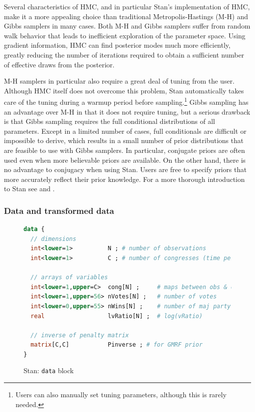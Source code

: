 Several characteristics of HMC, and in particular Stan's implementation of HMC, make it a more appealing choice than traditional Metropolis-Hastings (M-H) and Gibbs samplers in many cases. Both M-H and Gibbs samplers suffer from random walk behavior that leads to inefficient exploration of the parameter space. Using gradient information, HMC can find posterior modes much more efficiently, greatly reducing the number of iterations required to obtain a sufficient number of effective draws from the posterior. 

M-H samplers in particular also require a great deal of tuning from the user. Although HMC itself does not overcome this problem, Stan automatically takes care of the tuning during a warmup period before sampling.\footnote{Users can also manually set tuning parameters, although this is rarely needed.} Gibbs sampling has an advantage over M-H in that it does not require tuning, but a serious drawback is that Gibbs sampling requires the full conditional distributions of all parameters. Except in a limited number of cases, full conditionals are difficult or impossible to derive, which results in a small number of prior distributions that are feasible to use with Gibbs samplers. In particular, conjugate priors are often used even when more believable priors are available. On the other hand, there is no advantage to conjugacy when using Stan. Users are free to specify priors that more accurately reflect their prior knowledge. For a more thorough introduction to Stan see  and .

\subsubsection{Data and transformed data}

\begin{figure}[h]
\begin{lstlisting}[language=Stan, frame=trBL]
data {
  // dimensions 
  int<lower=1>          N ; # number of observations 
  int<lower=1>          C ; # number of congresses (time periods)
  
  // arrays of variables 
  int<lower=1,upper=C>  cong[N] ;     # maps between obs & congress
  int<lower=1,upper=56> nVotes[N] ;   # number of votes
  int<lower=0,upper=55> nWins[N] ;    # number of maj party victories
  real                  lvRatio[N] ;  # log(vRatio)
  
  // inverse of penalty matrix 
  matrix[C,C]           Pinverse ; # for GMRF prior
}
\end{lstlisting}
\caption{Stan: {\tt data} block}
\label{stan_data}
\end{figure}

